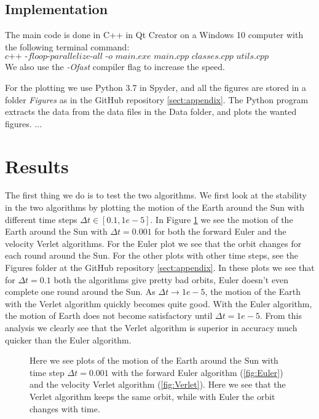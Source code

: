 \documentclass[12pt,a4paper,english]{article}
\begin{document}
\subsection{Implementation}
\label{subsect:Implementation}
The main code is done in C++ in Qt Creator on a Windows 10 computer with the following terminal command: \[\textit{c++ -floop-parallelize-all -o main.exe main.cpp classes.cpp utils.cpp SolarSystem.cpp}\]
We also use the \textit{-Ofast} compiler flag to increase the speed.

For the plotting we use Python 3.7 in Spyder, and all the figures are stored in a folder \textit{Figures} as in the GitHub repository \ref{sect:appendix}. The Python program extracts the data from the data files in the Data folder, and plots the wanted figures.
...




\section{Results}
\label{sect:Results}
The first thing we do is to test the two algorithms. We first look at the stability in the two algorithms by plotting the motion of the Earth around the Sun with different time steps $\Delta t\in[0.1,1e-5]$. In Figure \ref{fig:EulerVsVerlet} we see the motion of the Earth around the Sun with $\Delta t=0.001$ for both the forward Euler and the velocity Verlet algorithms. For the Euler plot we see that the orbit changes for each round around the Sun. For the other plots with other time steps, see the Figures folder at the GitHub repository \ref{sect:appendix}. In these plots we see that for $\Delta t=0.1$ both the algorithms give pretty bad orbits, Euler doesn't even complete one round around the Sun. As $\Delta t\rightarrow 1e-5$, the motion of the Earth with the Verlet algorithm quickly becomes quite good. With the Euler algorithm, the motion of Earth does not become satisfactory until $\Delta t=1e-5$. From this analysis we clearly see that the Verlet algorithm is superior in accuracy much quicker than the Euler algorithm.

\begin{figure}[htbp]
	\hspace{0.5em}
	\caption{Here we see plots of the motion of the Earth around the Sun with time step $\Delta t=0.001$ with the forward Euler algorithm (\ref{fig:Euler}) and the velocity Verlet algorithm (\ref{fig:Verlet}). Here we see that the Verlet algorithm keeps the same orbit, while with Euler the orbit changes with time.\label{fig:EulerVsVerlet}}
\end{figure}
\end{document}
